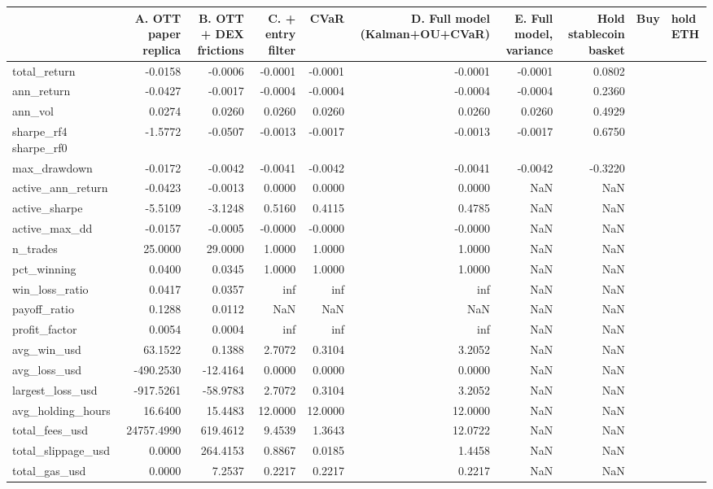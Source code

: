 \begin{tabular}{lrrrrrrr}
\toprule
 & A. OTT paper replica & B. OTT + DEX frictions & C. + entry filter & CVaR & D. Full model (Kalman+OU+CVaR) & E. Full model, variance & Hold stablecoin basket & Buy & hold ETH \\
\midrule
total_return & -0.0158 & -0.0006 & -0.0001 & -0.0001 & -0.0001 & -0.0001 & 0.0802 \\
ann_return & -0.0427 & -0.0017 & -0.0004 & -0.0004 & -0.0004 & -0.0004 & 0.2360 \\
ann_vol & 0.0274 & 0.0260 & 0.0260 & 0.0260 & 0.0260 & 0.0260 & 0.4929 \\
sharpe_rf4%
sharpe_rf0 & -1.5772 & -0.0507 & -0.0013 & -0.0017 & -0.0013 & -0.0017 & 0.6750 \\
max_drawdown & -0.0172 & -0.0042 & -0.0041 & -0.0042 & -0.0041 & -0.0042 & -0.3220 \\
active_ann_return & -0.0423 & -0.0013 & 0.0000 & 0.0000 & 0.0000 & NaN & NaN \\
active_sharpe & -5.5109 & -3.1248 & 0.5160 & 0.4115 & 0.4785 & NaN & NaN \\
active_max_dd & -0.0157 & -0.0005 & -0.0000 & -0.0000 & -0.0000 & NaN & NaN \\
n_trades & 25.0000 & 29.0000 & 1.0000 & 1.0000 & 1.0000 & NaN & NaN \\
pct_winning & 0.0400 & 0.0345 & 1.0000 & 1.0000 & 1.0000 & NaN & NaN \\
win_loss_ratio & 0.0417 & 0.0357 & inf & inf & inf & NaN & NaN \\
payoff_ratio & 0.1288 & 0.0112 & NaN & NaN & NaN & NaN & NaN \\
profit_factor & 0.0054 & 0.0004 & inf & inf & inf & NaN & NaN \\
avg_win_usd & 63.1522 & 0.1388 & 2.7072 & 0.3104 & 3.2052 & NaN & NaN \\
avg_loss_usd & -490.2530 & -12.4164 & 0.0000 & 0.0000 & 0.0000 & NaN & NaN \\
largest_loss_usd & -917.5261 & -58.9783 & 2.7072 & 0.3104 & 3.2052 & NaN & NaN \\
avg_holding_hours & 16.6400 & 15.4483 & 12.0000 & 12.0000 & 12.0000 & NaN & NaN \\
total_fees_usd & 24757.4990 & 619.4612 & 9.4539 & 1.3643 & 12.0722 & NaN & NaN \\
total_slippage_usd & 0.0000 & 264.4153 & 0.8867 & 0.0185 & 1.4458 & NaN & NaN \\
total_gas_usd & 0.0000 & 7.2537 & 0.2217 & 0.2217 & 0.2217 & NaN & NaN \\
\bottomrule
\end{tabular}

